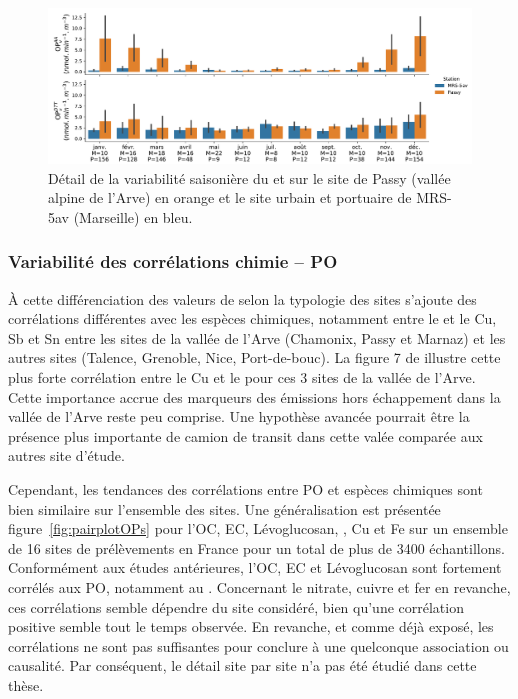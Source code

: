 \begin{figure}[ht]
    \centering
    \includegraphics[width=1.0\linewidth]{figures/chapter04/variabilite_saisonniere_MRS-Passy.pdf}
    \caption{Détail de la variabilité saisonière du \POAAv{} et \PODTTv{} sur le site de
        Passy (vallée alpine de l'Arve) en orange et le site urbain et portuaire de MRS-5av
        (Marseille) en bleu.
    }%
    \label{fig:variabilite_saisonniere_MRS_PASSY}
\end{figure}

\subsubsection{Variabilité des corrélations chimie -- PO}%
\label{ssub:_variabilité_des_corrélations_chimie_po}

À cette différenciation des valeurs de \POv{} selon la typologie des sites s'ajoute des
corrélations différentes avec les espèces chimiques, notamment entre le \POAAv{} et le
Cu, Sb et Sn entre les sites de la vallée de l'Arve (Chamonix, Passy et Marnaz) et les
autres sites (Talence, Grenoble, Nice, Port-de-bouc). La figure 7 de
\cite{calasSeasonal2019} illustre cette plus forte corrélation entre le Cu et le \POAAv{}
pour ces 3 sites de la vallée de l'Arve. Cette importance accrue des marqueurs des
émissions hors échappement dans la vallée de l'Arve reste peu comprise. Une hypothèse
avancée pourrait être la présence plus importante de camion de transit dans cette valée
comparée aux autres site d'étude.

Cependant, les tendances des corrélations entre PO et espèces chimiques sont bien
similaire sur l'ensemble des sites. Une généralisation est présentée
figure~\ref{fig:pairplotOPs} pour l'OC, EC, Lévoglucosan, \NOt, Cu et Fe sur un ensemble
de 16 sites de prélèvements en France pour un total de plus de 3400 échantillons.
Conformément aux études antérieures, l'OC, EC et Lévoglucosan sont fortement corrélés
aux PO, notamment au \POAAv. Concernant le nitrate, cuivre et fer en revanche, ces
corrélations semble dépendre du site considéré, bien qu'une corrélation positive semble
tout le temps observée.
En revanche, et comme déjà exposé, les corrélations ne sont pas suffisantes pour conclure
à une quelconque association ou causalité. Par conséquent, le détail site par site n'a pas
été étudié dans cette thèse.

